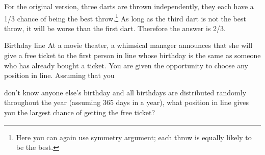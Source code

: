 \begin{solution}
For the original version, three darts are thrown independently, they each have a 1/3 chance of being the best throw.\footnote[13]{Here you can again use symmetry argument; each throw is equally likely to be the best.} As long as the third dart is not the best throw, it will be worse than the first dart. Therefore the answer is 2/3.

\end{solution}

\begin{problem}{Birthday line}
At a movie theater, a whimsical manager announces that she will give a free ticket to the first person in line whose birthday is the same as someone who has already bought a ticket. You are given the opportunity to choose any position in line. Assuming that you

don't know anyone else's birthday and all birthdays are distributed randomly throughout the year (assuming 365 days in a year), what position in line gives you the largest chance of getting the free ticket?
\end{problem}

